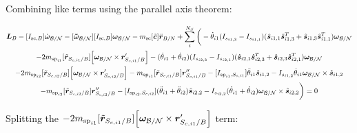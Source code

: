 \documentclass[paper]{aiaaNew}
\begin{document}
Combining like terms using the parallel axis theorem:

\begin{multline}
\bm L_B -[I_{\text{sc},B}] \dot{\bm\omega}_{\cal B/N} -[\bm{\tilde{\omega}}_{\cal B/N}] [I_{\text{sc},B}] \bm\omega_{\cal B/N} 
- m_{\text{sc}} [\tilde{\bm c}] \ddot{\bm r}_{B/N} 
+ \sum\limits_{i}^{N_S}\bigg( -\dot{\theta}_{i1} (I_{s_{i1,3}} - I_{s_{i1,1}})( \hat{\bm s}_{i1,1} \hat{\bm s}_{i1,3}^T + \hat{\bm s}_{i1,3} \hat{\bm s}_{i1,1}^T) \bm \omega_{\cal{B/N}} \\
-2 m_{\text{sp}_{i1}} [\tilde{{\bm r}}_{S_{c,i1}/B}] \Big[\bm\omega_{\cal B/N} \times \bm{r}'_{S_{c,i1}/B}\Big] -(\dot{\theta}_{i1}  + \dot{\theta}_{i2})(I_{s_{i2,3}} - I_{s_{i2,1}}) (\hat{\bm s}_{i2,1} \hat{\bm s}_{i2,3}^T + \hat{\bm s}_{i2,3} \hat{\bm s}_{i2,1}^T) \bm \omega_{\cal{B/N}} 
\\
- 2 m_{\text{sp}_{i2}} [\tilde{{\bm r}}_{S_{c,i2}/B}] \Big[ \bm\omega_{\cal B/N} \times \bm{r}'_{S_{c,i2}/B}\Big]
- m_{\text{sp}_{i1}} [\tilde{{\bm r}}_{S_{c,i1}/B}] \bm{r}''_{S_{c,i1}/B} 
-[I_{\text{sp}_{i1},S_{c,i1}}] \ddot{\theta}_{i1} \hat{\bm s}_{i1,2} 
-I_{s_{i1,2}} \dot{\theta}_{i1} \bm \omega_{\cal{B/N}} \times \hat{\bm s}_{i1,2}
\\- m_{\text{sp}_{i2}} [\tilde{{\bm r}}_{S_{c,i2}/B}] \bm{r}''_{S_{c,i2}/B}
-[I_{\text{sp}_{i2},S_{c,i2}}] (\ddot{\theta}_{i1}  + \ddot{\theta}_{i2})\hat{\bm s}_{i2,2} 
-I_{s_{i2,2}}  (\dot{\theta}_{i1}  + \dot{\theta}_{i2}) \bm \omega_{\cal{B/N}} \times \hat{\bm s}_{i2,2} \bigg) = 0
\end{multline}

Splitting the $-2 m_{\text{sp}_{i1}} [\tilde{{\bm r}}_{S_{c,i1}/B}] \Big[\bm\omega_{\cal B/N} \times \bm{r}'_{S_{c,i1}/B}\Big]$ term:
\end{document}
